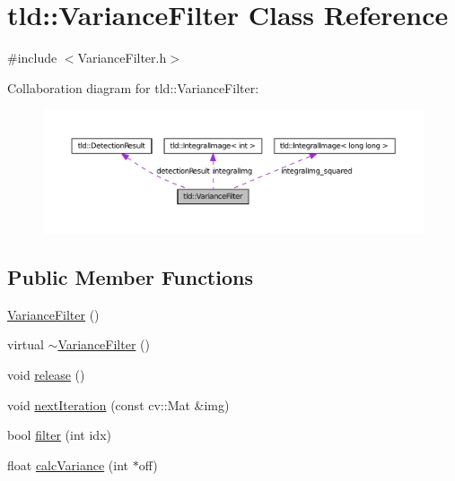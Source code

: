 \hypertarget{classtld_1_1_variance_filter}{
\section{tld::VarianceFilter Class Reference}
\label{classtld_1_1_variance_filter}
}


{\ttfamily \#include $<$VarianceFilter.h$>$}



Collaboration diagram for tld::VarianceFilter:
\nopagebreak
\begin{figure}[H]
\begin{center}
\leavevmode
\includegraphics[width=400pt]{classtld_1_1_variance_filter__coll__graph}
\end{center}
\end{figure}
\subsection*{Public Member Functions}
\begin{DoxyCompactItemize}
\item 
\hyperlink{classtld_1_1_variance_filter_a0b8e9189907c3c5e9729b63d9beb8c04}{VarianceFilter} ()
\item 
virtual \hyperlink{classtld_1_1_variance_filter_a8dfeb485fdad9b19ab1e37a91b7736f9}{$\sim$VarianceFilter} ()
\item 
void \hyperlink{classtld_1_1_variance_filter_aa5ec15d4b3670db357b1c7372f5ba25a}{release} ()
\item 
void \hyperlink{classtld_1_1_variance_filter_acd8b8eb452eed28f5a10d830a057eaa7}{nextIteration} (const cv::Mat \&img)
\item 
bool \hyperlink{classtld_1_1_variance_filter_af1c369cc5338fae5cea4ad997fb1b642}{filter} (int idx)
\item 
float \hyperlink{classtld_1_1_variance_filter_a3afefcc863a70e718a022731f7256d91}{calcVariance} (int $\ast$off)
\end{DoxyCompactItemize}
